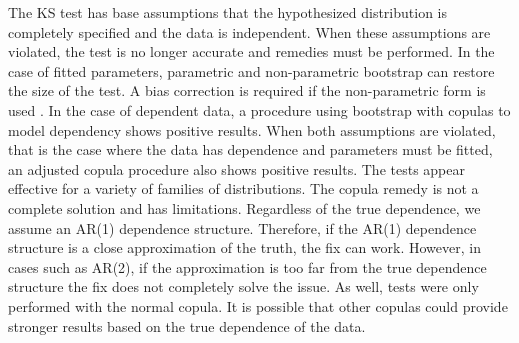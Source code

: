 \documentclass[12pt, letterpaper, titlepage]{article}
\begin{document}
The KS test has base assumptions that the hypothesized distribution is 
completely specified and the data is independent. When these assumptions are 
violated, the test is no longer accurate and remedies must be performed. In the 
case of fitted parameters, parametric and non-parametric bootstrap can restore 
the size of the test. A bias correction is required if the non-parametric form 
is used \citep{Babu}. In the case of dependent data, a procedure using bootstrap 
with copulas to model dependency shows positive results. When both assumptions 
are violated, that is the case where the data has dependence and parameters must 
be fitted, an adjusted copula procedure also shows positive results. The tests 
appear effective for a variety of families of distributions. The copula remedy 
is not a complete solution and has limitations. Regardless of the true 
dependence, we assume an AR(1) dependence structure. Therefore, if the AR(1) 
dependence structure is a close approximation of the truth, the fix can work. 
However, in cases such as AR(2), if the approximation is too far from the true 
dependence structure the fix does not completely solve the issue. As well, tests 
were only performed with the normal copula. It is possible that other copulas
could provide stronger results based on the true dependence of the data.




\end{document}
